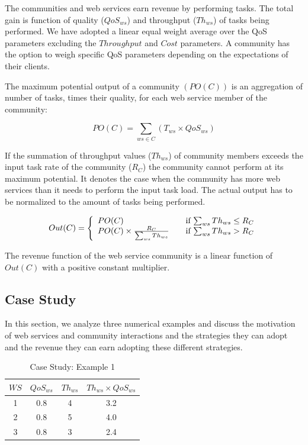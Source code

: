 The communities and web services earn revenue by performing tasks.
The total gain is function of quality ($QoS_{ws}$) and throughput
($Th_{ws}$) of tasks being performed. We have adopted a linear equal weight average over
the QoS parameters excluding the
$Throughput$ and $Cost$ parameters. A community has the option to
weigh specific QoS parameters depending on the expectations of
their clients.

The maximum potential output of a community $(PO(C))$  is an aggregation of number of tasks, times their quality, for each web service member of the community:

\begin{equation}
PO(C) = \sum_{ws \in C}{(T_{ws} \times QoS_{ws})}
\end{equation}

If the summation of throughput values ($Th_{ws}$) of community members exceeds the input task rate of the community ($R_C$) the community cannot perform at its maximum potential. It denotes the case when the community has more web services than it needs to perform the input task load. The actual output has to be normalized to the amount of tasks being performed.

\begin{equation}\label{out_c}
Out(C) = \left\{
  \begin{array}{l l}
    PO(C) & \quad \text{if $\sum_{ws}{Th_{ws}} \leq R_{C}$}\\
    PO(C) \times \frac{R_{C}}{\sum_{ws}{Th_{ws}}} & \quad \text{if $\sum_{ws}{Th_{ws}} > R_{C}$}
  \end{array} \right.
\end{equation}

The revenue function of the web service community is a linear function of $Out(C)$ with a positive constant multiplier.

\subsection{Case Study}

In this section, we analyze three numerical examples and discuss the motivation of web services and community interactions and the strategies they can adopt and the revenue they can earn adopting these different strategies.


\begin{table}[!t]
\renewcommand{\arraystretch}{1.3}
\caption{Case Study: Example 1}
\label{example_1}
\centering
\begin{tabular}{c c c c}
\hline
$WS$ & $QoS_{ws}$ & $Th_{ws}$ & $Th_{ws} \times QoS_{ws}$\\
\hline
1 & 0.8 & 4 & 3.2\\
2 & 0.8 & 5 & 4.0\\
3 & 0.8 & 3 & 2.4\\
\hline
\end{tabular}
\end{table}

